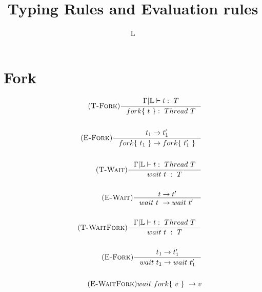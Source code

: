 \documentclass[12pt]{article}
\title {Typing Rules and Evaluation rules}
\author{L}
\def\lock {\mathbb{L}}
\begin{document}
\maketitle

\section{Fork}

\begin{align*}
    \tag {\textsc{T-Fork}}
    \inference[]{\Gamma |\lock\vdash t:~T}{ fork \{~t~\} :~Thread~T} 
    \\
    \\
    \tag {\textsc{E-Fork}}
    \inference[]{t_1->t_1'}{fork \{~t_1~\} -> fork \{~t_1'~\}}
    \\
    \\
    \tag {\textsc{T-Wait}}
    \inference[]{\Gamma|\lock\vdash t:~Thread~T}{ wait ~t~ :~T}
    \\
    \\
    \tag {\textsc{E-Wait}}
    \inference[]{t->t'}{wait ~t~ -> wait ~t'~}
    \\
    \\
    \tag {\textsc{T-WaitFork}}
    \inference[]{\Gamma|\lock\vdash t:~Thread~T}{ wait ~t~ :~T}
    \\
    \\
    \tag {\textsc{E-Fork}}
    \inference[]{t_1->t_1'}{wait~t_1 -> wait~t_1'}
    \\
    \\
    \tag {\textsc{E-WaitFork}}
    wait ~fork \{~v~\}~ -> v
    \\
\end{align*}
\end{document}
